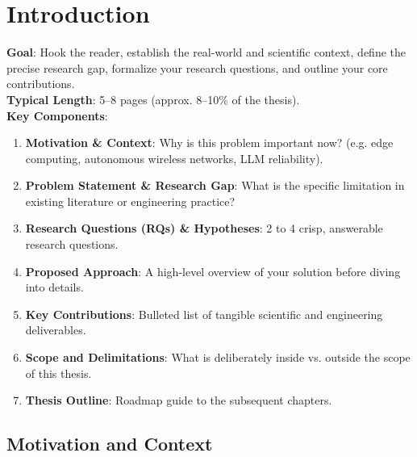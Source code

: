 
\chapter{Introduction}
\label{ch:introduction}

\begin{takeawaybox}
\textbf{Goal}: Hook the reader, establish the real-world and scientific context, define the precise research gap, formalize your research questions, and outline your core contributions.\\
\textbf{Typical Length}: 5--8 pages (approx. 8--10\% of the thesis).\\
\textbf{Key Components}:
\begin{enumerate}[leftmargin=*]
    \item \textbf{Motivation \& Context}: Why is this problem important now? (e.g. edge computing, autonomous wireless networks, LLM reliability).
    \item \textbf{Problem Statement \& Research Gap}: What is the specific limitation in existing literature or engineering practice?
    \item \textbf{Research Questions (RQs) \& Hypotheses}: 2 to 4 crisp, answerable research questions.
    \item \textbf{Proposed Approach}: A high-level overview of your solution before diving into details.
    \item \textbf{Key Contributions}: Bulleted list of tangible scientific and engineering deliverables.
    \item \textbf{Scope and Delimitations}: What is deliberately inside vs. outside the scope of this thesis.
    \item \textbf{Thesis Outline}: Roadmap guide to the subsequent chapters.
\end{enumerate}
\end{takeawaybox}

\section{Motivation and Context}
\label{sec:intro_motivation}

